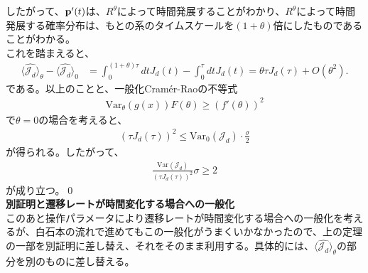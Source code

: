 \documentclass[a4paper,11pt]{jsarticle}
\numberwithin{equation}{section}
\begin{document}
したがって、$\vb{p}'(t)$は、$R^\theta$によって時間発展することがわかり、$R^\theta$によって時間発展する確率分布は、もとの系のタイムスケールを$(1+\theta)$倍にしたものであることがわかる。\\
これを踏まえると、
\begin{align}
    \langle \hat{\mathcal{J}_d} \rangle_\theta - \langle \hat{\mathcal{J}_d} \rangle_0 
    &= \int_0^{(1+\theta)\tau} dt J_d(t) - \int_0^\tau dt J_d(t) \nonumber =\theta \tau J_d(\tau) + O(\theta^2).
\end{align}
である。以上のことと、一般化Cram\'er-Raoの不等式
\begin{align}
    \text{Var}_{\theta}(g(x))F(\theta) \geq (f'(\theta))^2
\end{align}
で$\theta = 0$の場合を考えると、
\begin{align}
    (\tau J_d(\tau))^2 \leq \text{Var}_0(\mathcal{J}_d) \cdot \frac{\sigma}{2}
\end{align}
が得られる。したがって、
\begin{align}
    \frac{\text{Var}(\mathcal{J}_d)}{(\tau J_d(\tau))^2} \sigma \geq 2
\end{align}
が成り立つ。\qed\\

\textbf{別証明と遷移レートが時間変化する場合への一般化}\\
このあと操作パラメータにより遷移レートが時間変化する場合への一般化を考えるが、白石本の流れで進めてもこの一般化がうまくいかなかったので、上の定理の一部を別証明に差し替え、それをそのまま利用する。具体的には、$\langle \hat{\mathcal{J}_d} \rangle_\theta$の部分を別のものに差し替える。\\
\end{document}
